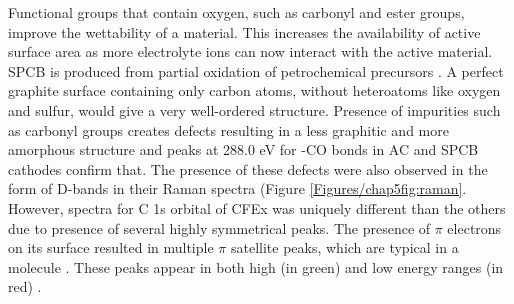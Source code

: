 Functional groups that contain oxygen, such as carbonyl and ester groups, improve the wettability of a material. This increases the availability of active surface area as more electrolyte ions can now interact with the active material\cite{younesi_analysis_2015}. SPCB is produced from partial oxidation of petrochemical precursors \cite{gnanamuthu_electrochemical_2011}. A perfect graphite surface containing only carbon atoms, without heteroatoms like oxygen and sulfur, would give a very well-ordered structure. Presence of impurities such as carbonyl groups creates defects resulting in a less graphitic and more amorphous structure\cite{hao_carbonaceous_2013} and peaks at 288.0 eV for -CO bonds in AC and SPCB cathodes confirm that. The presence of these defects were also observed in the form of D-bands in their Raman spectra (Figure \ref{Figures/chap5fig:raman}. However, spectra for C 1s orbital of CFEx was uniquely different than the others due to presence of several highly symmetrical peaks. The presence of $\pi$ electrons on its surface resulted in  multiple $\pi$ satellite peaks, which are typical in a  molecule \cite{skryleva_xps_2016}. These peaks appear in both high (in green) and low energy ranges (in red) \cite{erbahar_spectromicroscopy_2016, poirier_carbon_1993}.   

